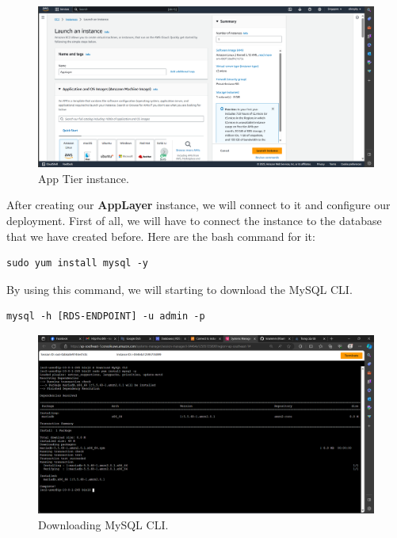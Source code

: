 \documentclass{article}
\begin{document}
\begin{figure}[h]
    \centering
    \includegraphics[width=12cm]{Pictures/App-tier/App_Instance_create.png}
    \caption{App Tier instance.}
    \label{fig:enter-label}
\end{figure}

After creating our \textbf{AppLayer} instance, we will connect to it and configure our deployment. First of all, we will have to connect the instance to the database that we have created before. Here are the bash command for it:\par

\begin{lstlisting}
sudo yum install mysql -y
\end{lstlisting}

By using this command, we will starting to download the MySQL CLI.\par

\begin{lstlisting}
mysql -h [RDS-ENDPOINT] -u admin -p
\end{lstlisting}
\begin{figure}[h]
    \centering
    \includegraphics[width=12cm]{Pictures/App-tier/EC2_down_MySQL.png}
    \caption{Downloading MySQL CLI.}
    \label{fig:enter-label}
\end{figure}
\end{document}
